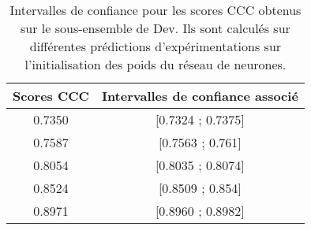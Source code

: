  \begin{table}
     \centering
     \begin{tabular}{|c|c|}
     \hline
          \textbf{Scores CCC} &\textbf{Intervalles de confiance associé} \\
          \hline
          0.7350	& [0.7324 ; 0.7375] \\
          0.7587	& [0.7563 ; 0.761] \\
          0.8054	& [0.8035 ; 0.8074] \\
          0.8524	& [0.8509 ; 0.854] \\
          0.8971	& [0.8960 ; 0.8982] \\
          \hline
     \end{tabular}
     \caption{Intervalles de confiance pour les scores CCC obtenus sur le sous-ensemble de Dev. Ils sont calculés sur différentes prédictions d'expérimentations sur l'initialisation des poids du réseau de neurones.}
     \label{tab:inter_conf}
 \end{table}

